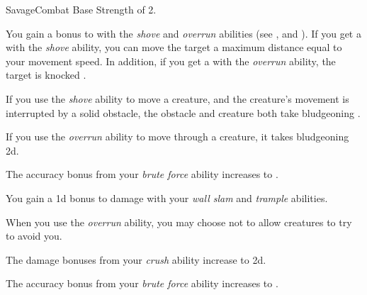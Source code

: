     \begin{feat}{Savage}{Combat}
        \featpre Base Strength of 2.

         You gain a  bonus to  with the \textit{shove} and \textit{overrun} abilities (see , and ).
        If you get a  with the \textit{shove} ability, you can move the target a maximum distance equal to your movement speed.
        In addition, if you get a  with the \textit{overrun} ability, the target is knocked .

         If you use the \textit{shove} ability to move a creature, and the creature's movement is interrupted by a solid obstacle, the obstacle and creature both take bludgeoning .

         If you use the \textit{overrun} ability to move through a creature, it takes bludgeoning  \minus2d.

         The accuracy bonus from your \textit{brute force} ability increases to .

         You gain a \plus1d bonus to damage with your \textit{wall slam} and \textit{trample} abilities.

         When you use the \textit{overrun} ability, you may choose not to allow creatures to try to avoid you.

         The damage bonuses from your \textit{crush} ability increase to \plus2d.

         The accuracy bonus from your \textit{brute force} ability increases to .
    \end{feat}

